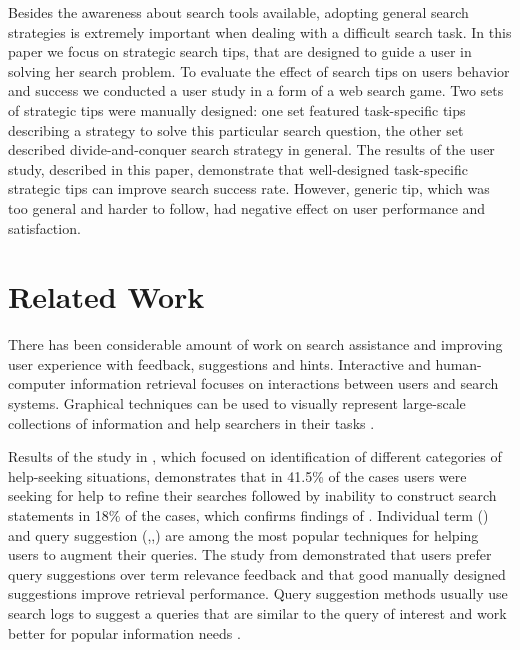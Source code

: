\documentclass{sig-alternate}
\begin{document}
Besides the awareness about search tools available, adopting general search strategies is extremely important when dealing with a difficult search task.
In this paper we focus on strategic search tips, that are designed to guide a user in solving her search problem.
To evaluate the effect of search tips on users behavior and success we conducted a user study in a form of a web search game.
Two sets of strategic tips were manually designed: one set featured task-specific tips describing a strategy to solve this particular search question, the other set described divide-and-conquer search strategy in general.
The results of the user study, described in this paper, demonstrate that well-designed task-specific strategic tips can improve search success rate.
However, generic tip, which was too general and harder to follow, had negative effect on user performance and satisfaction.

\section{Related Work}

There has been considerable amount of work on search assistance and improving user experience with feedback, suggestions and hints.
Interactive and human-computer information retrieval \cite{marchionini2006toward} focuses on interactions between users and search systems.
Graphical techniques can be used to visually represent large-scale collections of information and help searchers in their tasks \cite{card1999readings}.

Results of the study in \cite{xie2009understanding}, which focused on identification of different categories of help-seeking situations, demonstrates that in 41.5\% of the cases users were seeking for help to refine their searches followed by inability to construct search statements in 18\% of the cases, which confirms findings of \cite{Holscher2000337}.
Individual term (\cite{ruthven2003survey}) and query suggestion (\cite{Jones:2006:GQS:1135777.1135835},\cite{Bhatia:2011:QSA:2009916.2010023},\cite{Cao:2008:CQS:1401890.1401995}) are among the most popular techniques for helping users to augment their queries.
The study from \cite{Kelly:2009:CQT:1571941.1572006} demonstrated that users prefer query suggestions over term relevance feedback and that good manually designed suggestions improve retrieval performance.
Query suggestion methods usually use search logs to suggest a queries that are similar to the query of interest and work better for popular information needs \cite{Bhatia:2011:QSA:2009916.2010023}.
\end{document}
